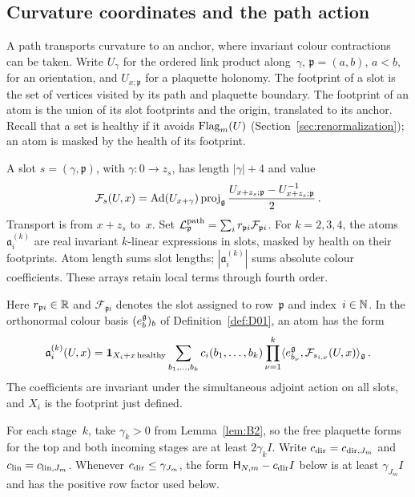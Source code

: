 \subsection{Curvature coordinates and the path action}\label{subsec:C-coordinates}

A path transports curvature to an anchor, where invariant colour contractions can be taken. Write $U_\gamma$ for the ordered link product along~$\gamma$, $\mathfrak p=(a,b)$, $a<b$, for an orientation, and $U_{x;\mathfrak p}$ for a plaquette holonomy. The footprint of a slot is the set of vertices visited by its path and plaquette boundary. The footprint of an atom is the union of its slot footprints and the origin, translated to its anchor. Recall that a set is healthy if it avoids $\operatorname{Flag}_m(U)$ (Section~\ref{sec:renormalization}); an atom is masked by the health of its footprint.

\begin{definition}\label{def:D22}
A slot $s=(\gamma,\mathfrak p)$, with $\gamma:0\to z_s$, has length $|\gamma|+4$ and value
\begin{equation*}
\mathcal F_s(U,x)=\operatorname{Ad}(U_{x+\gamma})\operatorname{proj}_{\mathfrak{g}}
\frac{U_{x+z_s;\mathfrak p}-U_{x+z_s;\mathfrak p}^{-1}}2\,.
\end{equation*}
Transport is from $x+z_s$ to~$x$. Set $\mathcal L_{\mathfrak p}^{\rm path}=\sum_i r_{\mathfrak p i}\mathcal F_{\mathfrak p i}$. For $k=2,3,4$, the atoms $\mathfrak a_i^{(k)}$ are real invariant $k$-linear expressions in slots, masked by health on their footprints. Atom length sums slot lengths; $|\mathfrak a_i^{(k)}|$ sums absolute colour coefficients. These arrays retain local terms through fourth order.
\end{definition}

Here $r_{\mathfrak p i}\in\mathbb{R}$ and $\mathcal F_{\mathfrak p i}$ denotes the slot assigned to row~$\mathfrak p$ and index~$i\in\mathbb{N}$. In the orthonormal colour basis $(e_b^{\mathfrak{g}})_b$ of Definition~\ref{def:D01}, an atom has the form
\begin{equation*}
\mathfrak a_i^{(k)}(U,x)=\mathbf1_{X_i+x\,\mathrm{healthy}}
\sum_{b_1,\ldots,b_k} c_i(b_1,\ldots,b_k)
\prod_{\nu=1}^k\langle e_{b_\nu}^{\mathfrak{g}},\mathcal F_{s_{i,\nu}}(U,x)\rangle_{\mathfrak{g}}\,.
\end{equation*}
The coefficients are invariant under the simultaneous adjoint action on all slots, and $X_i$ is the footprint just defined.

For each stage~$k$, take $\gamma_k>0$ from Lemma~\ref{lem:B2}, so the free plaquette forms for the top and both incoming stages are at least $2\gamma_k I$. Write $c_{\rm dir}=c_{{\rm dir},J_m}$ and $c_{\rm lin}=c_{{\rm lin},J_m}$. Whenever $c_{\rm dir}\le\gamma_{J_m}$, the form $\mathsf H_{N,m}-c_{\rm dir}I$ below is at least $\gamma_{J_m}I$ and has the positive row factor used below.

